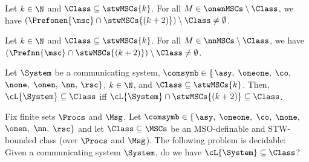 \begin{proposition}\label{lem:onen_pref_stw_k+2}
	Let $k \in \N$ and $\Class \subseteq \stwMSCs{k}$. For all
	$M \in \onenMSCs \setminus \Class$, we have
	$(\Prefonen{\msc} \cap \stwMSCs{(k+2)}) \setminus \Class \neq \emptyset$.
\end{proposition}

\begin{proposition}\label{lem:nn_pref_stw_k+2}
	Let $k \in \N$ and $\Class \subseteq \stwMSCs{k}$. For all
	$M \in \nnMSCs \setminus \Class$, we have
	$(\Prefnn{\msc} \cap \stwMSCs{(k+2)}) \setminus \Class \neq \emptyset$.
\end{proposition}

\begin{proposition}\label{lem:continuous}
	Let $\System$ be a communicating system, $\comsymb \in \{$$\asy, $ $\oneone, $ $\co, $ $\none, $ $\onen, $ $\nn, $ $\rsc\}$,
	$k \in \N$, and $\Class \subseteq \stwMSCs{k}$.
	Then, $\cL{\System} \subseteq \Class$ iff
	$\cL{\System} \cap \stwMSCs{(k+2)} \subseteq \Class$.
\end{proposition}

\begin{theorem}\label{thm:sync}
	Fix finite sets $\Procs$ and $\Msg$.
	Let $\comsymb \in \{$$\asy, $ $\oneone, $ $\co, $ $\none, $ $\onen, $ $\nn, $ $\rsc\}$ and let $\Class \subseteq \MSCs$ be an MSO-definable and STW-bounded class (over $\Procs$ and $\Msg$).
	The following problem is decidable:
	Given a communicating system $\System$, do we have $\cL{\System} \subseteq \Class$?
\end{theorem}

